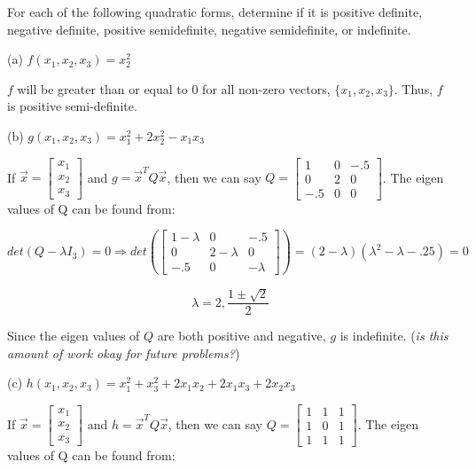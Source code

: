 \documentclass[12pt]{extarticle}
\theoremstyle{definition}
\begin{document}
\begin{problem}
	For each of the following quadratic forms, determine if it is positive definite, negative definite, positive semidefinite, negative semidefinite, or indefinite.

	\begin{description}
		\item{(a)} $f(x_1,x_2,x_3)=x_2^2$

			$f$ will be greater than or equal to $0$ for all non-zero vectors, $\{x_1,x_2,x_3\}$. Thus, $f$ is positive semi-definite.

		\item{(b)} $g(x_1,x_2,x_3)=x_1^2+2x_2^2-x_1x_3$

			If $\vec{x} = \begin{bmatrix}x_1\\x_2\\x_3\end{bmatrix}$ and $g = \vec{x}^TQ\vec{x}$, then we can 
			say $Q = \begin{bmatrix}1 & 0 & -.5\\ 0 & 2 & 0 \\ -.5 & 0 & 0\end{bmatrix}$. The eigen values of Q can be found from:

			$$det(Q - \lambda I_3) = 0 \Longrightarrow det(
			\begin{bmatrix}1-\lambda & 0 & -.5\\ 0 & 2-\lambda & 0 \\ -.5 & 0 & -\lambda\end{bmatrix}) 
			= (2-\lambda)({\lambda}^2-\lambda-.25) = 0$$

			$$\lambda = 2, \frac{1 \pm \sqrt{2}}{2}$$

			Since the eigen values of $Q$ are both positive and negative, $g$ is indefinite. (\textit{is this amount of work okay for future problems?})

		\item{(c)} $h(x_1,x_2,x_3)=x_1^2+x_3^2+2x_1x_2+2x_1x_3+2x_2x_3$

			If $\vec{x} = \begin{bmatrix}x_1\\x_2\\x_3\end{bmatrix}$ and $h = \vec{x}^TQ\vec{x}$, then we can 
			say $Q = \begin{bmatrix}1 & 1 & 1\\ 1 & 0 & 1 \\ 1 & 1 & 1\end{bmatrix}$. The eigen values of Q can be found from:


\end{description}
\end{problem}
\end{document}
